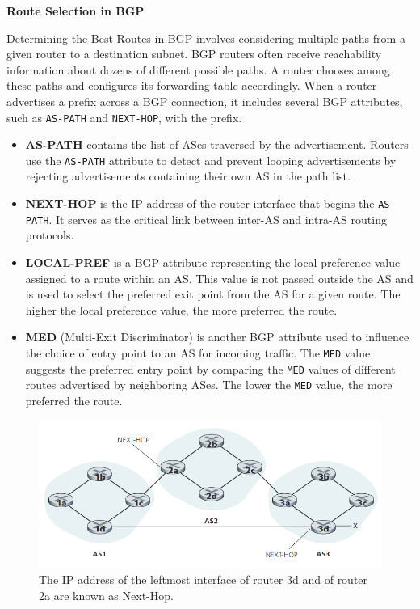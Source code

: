 \newpage
\noindent\textbf{Route Selection in BGP}\mbox{}

\noindent Determining the Best Routes in BGP involves considering multiple paths from a given router to a destination subnet. BGP routers often receive reachability information about dozens of different possible paths. A router chooses among these paths and configures its forwarding table accordingly. When a router advertises a prefix across a BGP connection, it includes several BGP attributes, such as \texttt{AS-PATH} and \texttt{NEXT-HOP}, with the prefix.

\begin{itemize}
    \item \textbf{AS-PATH} contains the list of ASes traversed by the advertisement. Routers use the \texttt{AS-PATH} attribute to detect and prevent looping advertisements by rejecting advertisements containing their own AS in the path list. 

    \item \textbf{NEXT-HOP} is the IP address of the router interface that begins the \texttt{AS-PATH}. It serves as the critical link between inter-AS and intra-AS routing protocols.

    \item \textbf{LOCAL-PREF} is a BGP attribute representing the local preference value assigned to a route within an AS. This value is not passed outside the AS and is used to select the preferred exit point from the AS for a given route. The higher the local preference value, the more preferred the route.

    \item \textbf{MED} (Multi-Exit Discriminator) is another BGP attribute used to influence the choice of entry point to an AS for incoming traffic. The \texttt{MED} value suggests the preferred entry point by comparing the \texttt{MED} values of different routes advertised by neighboring ASes. The lower the \texttt{MED} value, the more preferred the route.
\end{itemize}

\begin{figure}[H]
    \centering
    \includegraphics[width = 0.825\linewidth]{img/4/control-plane/BGP/route.png}
    \caption{The IP address of the leftmost interface of router 3d and of router 2a are known as Next-Hop.}
    \label{fig:route}
\end{figure}

